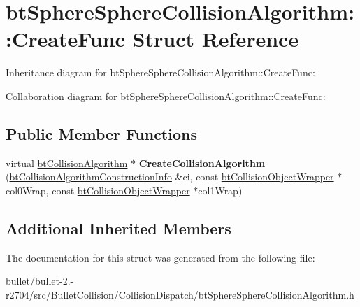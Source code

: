 \hypertarget{structbt_sphere_sphere_collision_algorithm_1_1_create_func}{\section{bt\+Sphere\+Sphere\+Collision\+Algorithm\+:\+:Create\+Func Struct Reference}
\label{structbt_sphere_sphere_collision_algorithm_1_1_create_func}
}


Inheritance diagram for bt\+Sphere\+Sphere\+Collision\+Algorithm\+:\+:Create\+Func\+:


Collaboration diagram for bt\+Sphere\+Sphere\+Collision\+Algorithm\+:\+:Create\+Func\+:
\subsection*{Public Member Functions}
\begin{DoxyCompactItemize}
\item 
\hypertarget{structbt_sphere_sphere_collision_algorithm_1_1_create_func_af0dddc096640e42de8388e2d20fbad59}{virtual \hyperlink{classbt_collision_algorithm}{bt\+Collision\+Algorithm} $\ast$ {\bfseries Create\+Collision\+Algorithm} (\hyperlink{structbt_collision_algorithm_construction_info}{bt\+Collision\+Algorithm\+Construction\+Info} \&ci, const \hyperlink{structbt_collision_object_wrapper}{bt\+Collision\+Object\+Wrapper} $\ast$col0\+Wrap, const \hyperlink{structbt_collision_object_wrapper}{bt\+Collision\+Object\+Wrapper} $\ast$col1\+Wrap)}\label{structbt_sphere_sphere_collision_algorithm_1_1_create_func_af0dddc096640e42de8388e2d20fbad59}

\end{DoxyCompactItemize}
\subsection*{Additional Inherited Members}


The documentation for this struct was generated from the following file\+:\begin{DoxyCompactItemize}
\item 
bullet/bullet-\/2.-\/r2704/src/\+Bullet\+Collision/\+Collision\+Dispatch/bt\+Sphere\+Sphere\+Collision\+Algorithm.\+h\end{DoxyCompactItemize}
